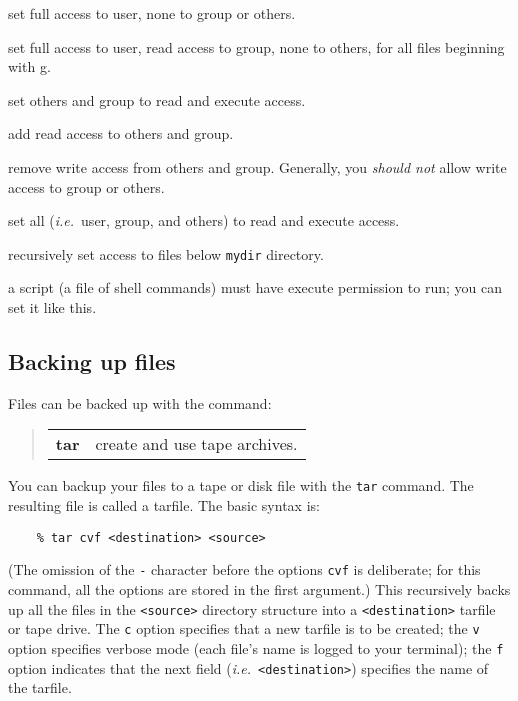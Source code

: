 \goodbreak

\exbegin

{set full access to user, none to group or others.}

{set full access to user, read access to group, none to others, for all files
beginning with g.}

{set others and group to read and execute access.}

{add read access to others and group.}

{remove write access from others and group. Generally, you {\em should not\/}
allow write access to group or others.}

{set all ({\em i.e.}\ user, group, and others) to read and execute access.}

{recursively set access to files below {\tt mydir} directory.}

{a script (a file of shell commands) must have execute permission to run; you
can set it like this.}

\exend

\subsection{Backing up files}

Files can be backed up with the command:
\begin{quote}
\begin{tabular}{lp{72mm}}

{\bf tar}  & create and use tape archives.

\end{tabular}
\end{quote}
You can backup your files to a tape or disk file with the {\tt tar} command.
The resulting file is called a tarfile.
The basic syntax is:
\begin{verbatim}
    % tar cvf <destination> <source>
\end{verbatim}
(The omission of the {\tt -} character before the options {\tt cvf} is
deliberate; for this command, all the options are stored in the first argument.)
This recursively backs up all the files in the {\tt <source>} directory
structure into a {\tt <destination>} tarfile or tape drive.
The {\tt c} option specifies that a new tarfile is to be created;
the {\tt v} option specifies verbose mode (each file's name is logged to your
terminal);
the {\tt f} option indicates that the next field
({\em i.e.}\ {\tt <destination>}) specifies the name of the tarfile.

